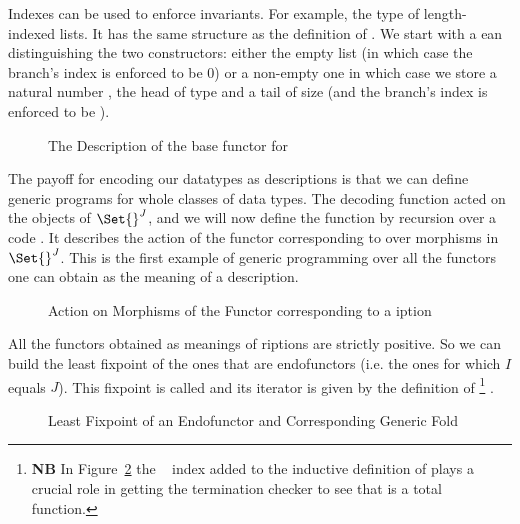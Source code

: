 Indexes can be used to enforce invariants. For example, the type {  }
of length-indexed lists. It has the same structure as the definition of .
We start with a ean distinguishing the two constructors: either
the empty list (in which case the branch's index is enforced to be $0$) or a
non-empty one in which case we store a natural number , the head of type
 and a tail of size  (and the branch's index is enforced to be
 ).

\begin{figure}[h]
\caption{The Description of the base functor for   }\label{figure:vecD}
\end{figure}

The payoff for encoding our datatypes as descriptions is that we can define
generic programs for whole classes of data types. The decoding function 
acted on the objects of $\Set{}^J$, and we will now define the function  by
recursion over a code . It describes the action of the functor corresponding
to  over morphisms in $\Set{}^J$. This is the first example of generic
programming over all the functors one can obtain as the meaning of a description.

\begin{figure}[h]
\caption{Action on Morphisms of the Functor corresponding to a iption}
\end{figure}

All the functors obtained as meanings of riptions are strictly
positive. So we can build the least fixpoint of the ones that are endofunctors
(i.e. the ones for which $I$ equals $J$). This fixpoint is called 
and its iterator is given by the definition of  %
\footnote{\textbf{NB} 
In Figure~\ref{figure:datamu} the ~\cite{DBLP:journals/corr/abs-1012-4896} index added
to the inductive definition of  plays a crucial role in getting the
termination checker to see that  is a total function. 
}
.

\begin{figure}[h]
\caption{Least Fixpoint of an Endofunctor and Corresponding Generic Fold}\label{figure:datamu}
\end{figure}


